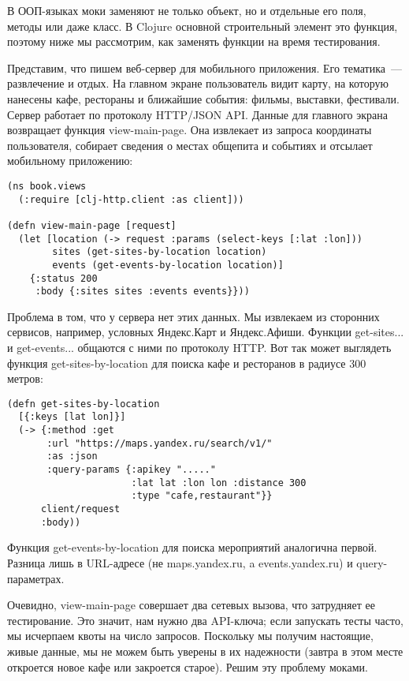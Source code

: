 В ООП-языках моки заменяют не только объект, но и отдельные его поля, методы или
даже класс. В Clojure основной строительный элемент это функция, поэтому ниже мы
рассмотрим, как заменять функции на время тестирования.

Представим, что пишем веб-сервер для мобильного приложения. Его тематика~---
развлечение и отдых. На главном экране пользователь видит карту, на которую
нанесены кафе, рестораны и ближайшие события: фильмы, выставки,
фестивали. Сервер работает по протоколу HTTP/JSON API. Данные для главного
экрана возвращает функция view-main-page. Она извлекает из запроса координаты
пользователя, собирает сведения о местах общепита и событиях и отсылает
мобильному приложению:

\begin{verbatim}
(ns book.views
  (:require [clj-http.client :as client]))

(defn view-main-page [request]
  (let [location (-> request :params (select-keys [:lat :lon]))
        sites (get-sites-by-location location)
        events (get-events-by-location location)]
    {:status 200
     :body {:sites sites :events events}}))
\end{verbatim}

Проблема в том, что у сервера нет этих данных. Мы извлекаем из сторонних
сервисов, например, условных Яндекс.Карт и Яндекс.Афиши. Функции get-sites... и
get-events... общаются с ними по протоколу HTTP. Вот так может выглядеть функция
get-sites-by-location для поиска кафе и ресторанов в радиусе 300 метров:

\begin{verbatim}
(defn get-sites-by-location
  [{:keys [lat lon]}]
  (-> {:method :get
       :url "https://maps.yandex.ru/search/v1/"
       :as :json
       :query-params {:apikey "....."
                      :lat lat :lon lon :distance 300
                      :type "cafe,restaurant"}}
      client/request
      :body))
\end{verbatim}

Функция get-events-by-location для поиска мероприятий аналогична первой. Разница
лишь в URL-адресе (не maps.yandex.ru, a events.yandex.ru) и query-параметрах.

Очевидно, view-main-page совершает два сетевых вызова, что затрудняет ее
тестирование. Это значит, нам нужно два API-ключа; если запускать тесты часто,
мы исчерпаем квоты на число запросов. Поскольку мы получим настоящие, живые
данные, мы не можем быть уверены в их надежности (завтра в этом месте откроется
новое кафе или закроется старое). Решим эту проблему моками.

